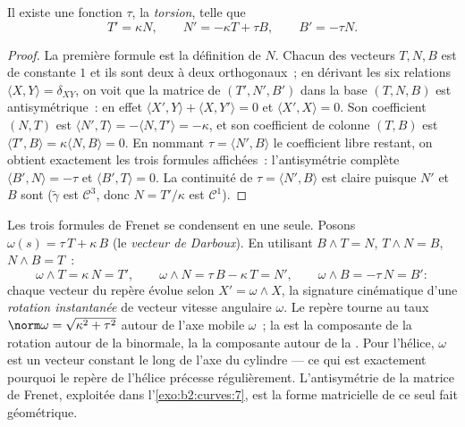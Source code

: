 \begin{theorem}\label{thm:b2:curves:frenet3d}
Il existe une fonction  $\tau$, la \emph{torsion}, telle que
\[
T' = \kappa N, \qquad
N' = -\kappa T + \tau B, \qquad
B' = -\tau N .
\]
\end{theorem}

\begin{proof}
La première formule est la définition de $N$. Chacun des vecteurs
$T, N, B$ est de  constante $1$ et ils sont deux à deux
orthogonaux~; en dérivant les six relations $\langle X, Y\rangle =
\delta_{XY}$, on voit que la matrice de $(T', N', B')$ dans la base
$(T, N, B)$ est antisymétrique~: en effet $\langle X', Y\rangle +
\langle X, Y'\rangle = 0$ et
$\langle X', X\rangle = 0$. Son coefficient $(N, T)$ est $\langle
N', T\rangle = -\langle N, T'\rangle = -\kappa$, et son coefficient
de colonne $(T, B)$ est
$\langle T', B\rangle = \kappa\langle N, B\rangle = 0$. En nommant
$\tau = \langle N', B\rangle$ le coefficient libre restant, on
obtient exactement les trois formules affichées~: l'antisymétrie
complète $\langle B', N\rangle = -\tau$ et
$\langle B', T\rangle = 0$. La continuité de $\tau = \langle N',
B\rangle$ est claire puisque $N'$ et $B$ sont 
($\tilde\gamma$ est
$\mathcal{C}^3$, donc $N = T'/\kappa$ est $\mathcal{C}^1$).
\end{proof}

\begin{example}\label{ex:b2:curves:darboux}
Les trois formules de Frenet se condensent en une seule. Posons
$\omega(s) =
\tau\,T + \kappa\,B$ (le \emph{vecteur de Darboux}). En utilisant
$B \wedge T = N$, $T \wedge N = B$, $N \wedge B = T$~:
\[
\omega \wedge T = \kappa\,N = T', \qquad
\omega \wedge N = \tau\,B - \kappa\,T = N', \qquad
\omega \wedge B = -\tau\,N = B' :
\]
chaque vecteur du repère évolue selon $X' = \omega \wedge X$, la
signature cinématique d'une \emph{rotation instantanée} de
vecteur vitesse angulaire $\omega$. Le repère tourne au taux
$\norm\omega = \sqrt{\kappa^2 + \tau^2}$ autour de l'axe mobile
$\omega$~; la  est la composante de la rotation autour de
la binormale, la  la composante autour de la . Pour
l'hélice, $\omega$ est un vecteur constant le long de l'axe du
cylindre --- ce qui est exactement pourquoi le repère de l'hélice
précesse régulièrement. L'antisymétrie de la matrice de Frenet,
exploitée dans l'\cref{exo:b2:curves:7}, est la forme matricielle
de ce seul fait géométrique.
\end{example}

